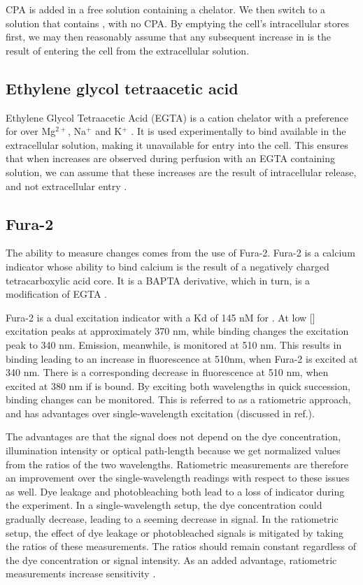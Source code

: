 CPA is added in a \Ca{} free solution containing a \Ca{} chelator. We then switch to a solution that contains \Ca{}, with no CPA. By emptying the cell's intracellular stores first, we may then reasonably assume that any subsequent increase in \cai{} is the result of \Ca{} entering the cell from the extracellular solution. 
 

\subsection{Ethylene glycol tetraacetic acid}
Ethylene Glycol Tetraacetic Acid (EGTA) is a cation chelator with a preference for \Ca{} over Mg$^{2+}$, Na$^+$ and K$^+$ %
\citep{GLambert:2006p191}. It is used experimentally to bind available \Ca{} in the extracellular solution, making it unavailable for entry into the cell. This ensures that when \cai{} increases are observed during perfusion with an EGTA containing solution, we can assume that these increases are the result of intracellular \Ca{} release, and not extracellular \Ca{} entry \citep{GLambert:2006p191,WPutney:2006p130}.

\subsection{Fura-2}
The ability to measure \cai{} changes comes from the use of Fura-2. Fura-2 is a calcium indicator whose ability to bind calcium is the result of a negatively charged tetracarboxylic acid core. It is a BAPTA derivative, which in turn, is a modification of EGTA  \citep{GLambert:2006p191,WPutney:2006p130}. %

Fura-2 is a dual excitation indicator with a Kd of 145 nM for \Ca. At low [\Ca{}] excitation peaks at approximately 370 nm, while binding \Ca{} changes the excitation peak to 340 nm. Emission, meanwhile, is monitored at 510 nm. This results in \Ca{} binding leading to an increase in fluorescence at 510nm, when Fura-2 is excited at 340 nm. There is a corresponding decrease in fluorescence at 510 nm, when excited at 380 nm if \Ca{} is bound. By exciting both wavelengths in quick succession, \Ca{} binding changes can be monitored. This is referred to as a ratiometric approach, and has advantages over single-wavelength excitation (discussed in ref.\citealp{GLambert:2006p191}). %


The advantages are that the signal does not depend on the dye concentration, illumination intensity or optical path-length because we get normalized values from the ratios of the two wavelengths. Ratiometric measurements are therefore an improvement over the single-wavelength readings with respect to these issues as well. Dye leakage and photobleaching both lead to a loss of indicator during the experiment. In a single-wavelength setup, the dye concentration could gradually decrease, leading to a seeming decrease in \Ca{} signal. In the ratiometric setup, the effect of dye leakage or photobleached signals is mitigated by taking the ratios of these measurements. The ratios should remain constant regardless of the dye concentration or signal intensity. As an added advantage, ratiometric measurements increase sensitivity \citep{GLambert:2006p191, WPutney:2006p130}.  %

